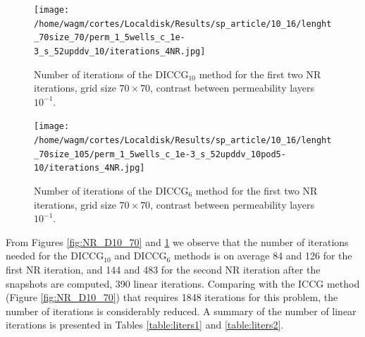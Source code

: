 \documentclass[12pt]{article}
\begin{document}
\begin{figure}[!ht]
\centering
\begin{minipage}{.4\textwidth}
\hspace{-1cm}
\texttt{[image: /home/wagm/cortes/Localdisk/Results/sp\_article/10\_16/lenght\_70size\_70/perm\_1\_5wells\_c\_1e-3\_s\_52upddv\_10/iterations\_4NR.jpg]}
\vspace{-1.3cm}
\caption{Number of iterations of the DICCG$_{10}$ method for the first two NR iterations, grid size $70\times 70$, contrast between permeability layers $10^{-1}$.}
\label{fig:NR_D10_70}
\end{minipage}%
\hspace{15mm}
\begin{minipage}{.4\textwidth}
\hspace{-1cm}
\texttt{[image: /home/wagm/cortes/Localdisk/Results/sp\_article/10\_16/lenght\_70size\_105/perm\_1\_5wells\_c\_1e-3\_s\_52upddv\_10pod5-10/iterations\_4NR.jpg]}
\vspace{-1.3cm}
\caption{Number of iterations of the DICCG$_{6}$ method for the first two NR iterations, grid size $70\times 70$, contrast between permeability layers $10^{-1}$.}
\label{fig:NR_D6_70}
\end{minipage}
\end{figure}

\begin{figure}[!h]
\centering

\end{figure}




From Figures \ref{fig:NR_D10_70} and \ref{fig:NR_D6_70} we observe that the number of iterations needed for
the DICCG$_{10}$ and DICCG$_6$ methods is on average 84 and 126 for the first NR iteration, and 144 and 483
for the second NR iteration after the snapshots are computed, 390 linear iterations. 
Comparing with the ICCG method (Figure \ref{fig:NR_D10_70}) that requires 1848 iterations for this problem,
the number of iterations is considerably reduced. A summary of the number of linear iterations is presented 
in Tables \ref{table:liters1} and \ref{table:liters2}.
\end{document}
